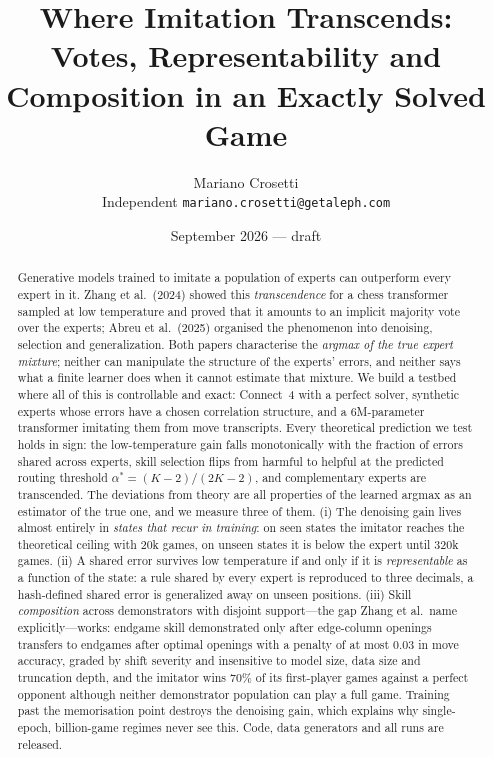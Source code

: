 \documentclass[11pt]{article}
\title{\textbf{Where Imitation Transcends:\\ Votes, Representability and Composition in an Exactly Solved Game}}
\author{Mariano Crosetti\\ \small Independent \quad \texttt{mariano.crosetti@getaleph.com}}
\date{September 2026 --- draft}
\begin{document}
\maketitle

\begin{abstract}
Generative models trained to imitate a population of experts can outperform every expert in it. Zhang et al.\ (2024) showed this \emph{transcendence} for a chess transformer sampled at low temperature and proved that it amounts to an implicit majority vote over the experts; Abreu et al.\ (2025) organised the phenomenon into denoising, selection and generalization. Both papers characterise the \emph{argmax of the true expert mixture}; neither can manipulate the structure of the experts' errors, and neither says what a finite learner does when it cannot estimate that mixture. We build a testbed where all of this is controllable and exact: Connect~4 with a perfect solver, synthetic experts whose errors have a chosen correlation structure, and a 6M-parameter transformer imitating them from move transcripts. Every theoretical prediction we test holds in sign: the low-temperature gain falls monotonically with the fraction of errors shared across experts, skill selection flips from harmful to helpful at the predicted routing threshold $\alpha^*=(K-2)/(2K-2)$, and complementary experts are transcended. The deviations from theory are all properties of the learned argmax as an estimator of the true one, and we measure three of them. (i) The denoising gain lives almost entirely in \emph{states that recur in training}: on seen states the imitator reaches the theoretical ceiling with 20k games, on unseen states it is below the expert until 320k games. (ii) A shared error survives low temperature if and only if it is \emph{representable} as a function of the state: a rule shared by every expert is reproduced to three decimals, a hash-defined shared error is generalized away on unseen positions. (iii) Skill \emph{composition} across demonstrators with disjoint support---the gap Zhang et al.\ name explicitly---works: endgame skill demonstrated only after edge-column openings transfers to endgames after optimal openings with a penalty of at most $0.03$ in move accuracy, graded by shift severity and insensitive to model size, data size and truncation depth, and the imitator wins $70\%$ of its first-player games against a perfect opponent although neither demonstrator population can play a full game. Training past the memorisation point destroys the denoising gain, which explains why single-epoch, billion-game regimes never see this. Code, data generators and all runs are released.
\end{abstract}
\end{document}
